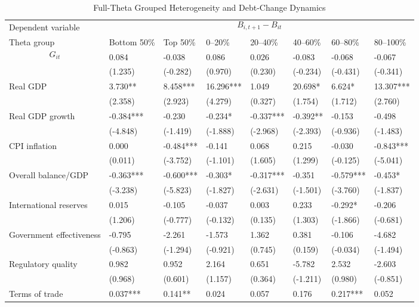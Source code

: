 \begin{table}[H]\centering
\begin{threeparttable}
\caption{Full-Theta Grouped Heterogeneity and Debt-Change Dynamics}
\label{tab:theta_group_heterogeneity_debt}
\scriptsize
\begin{tabularx}{\textwidth}{lYYYYYYY}
\toprule
Dependent variable &  \\
\cmidrule(lr){2-8}
Theta group & Bottom 50\% & Top 50\% & 0--20\% & 20--40\% & 40--60\% & 60--80\% & 80--100\% \\
\midrule
$$G_{it}$$ & 0.084 & -0.038 & 0.086 & 0.026 & -0.083 & -0.068 & -0.067 \\
  & (1.235) & (-0.282) & (0.970) & (0.230) & (-0.234) & (-0.431) & (-0.341) \\
Real GDP & 3.730** & 8.458*** & 16.296*** & 1.049 & 20.698* & 6.624* & 13.307*** \\
  & (2.358) & (2.923) & (4.279) & (0.327) & (1.754) & (1.712) & (2.760) \\
Real GDP growth & -0.384*** & -0.230 & -0.234* & -0.337*** & -0.392** & -0.153 & -0.498 \\
  & (-4.848) & (-1.419) & (-1.888) & (-2.968) & (-2.393) & (-0.936) & (-1.483) \\
CPI inflation & 0.000 & -0.484*** & -0.141 & 0.068 & 0.215 & -0.030 & -0.843*** \\
  & (0.011) & (-3.752) & (-1.101) & (1.605) & (1.299) & (-0.125) & (-5.041) \\
Overall balance/GDP & -0.363*** & -0.600*** & -0.303* & -0.317*** & -0.351 & -0.579*** & -0.453* \\
  & (-3.238) & (-5.823) & (-1.827) & (-2.631) & (-1.501) & (-3.760) & (-1.837) \\
International reserves & 0.015 & -0.105 & -0.037 & 0.003 & 0.233 & -0.292* & -0.206 \\
  & (1.206) & (-0.777) & (-0.132) & (0.135) & (1.303) & (-1.866) & (-0.681) \\
Government effectiveness & -0.795 & -2.261 & -1.573 & 1.362 & 0.381 & -0.106 & -4.682 \\
  & (-0.863) & (-1.294) & (-0.921) & (0.745) & (0.159) & (-0.034) & (-1.494) \\
Regulatory quality & 0.982 & 0.952 & 2.164 & 0.651 & -5.782 & 2.532 & -2.603 \\
  & (0.968) & (0.601) & (1.157) & (0.364) & (-1.211) & (0.980) & (-0.851) \\
Terms of trade & 0.037*** & 0.141** & 0.024 & 0.057 & 0.176 & 0.217*** & 0.052 \\

\end{tabularx}
\end{threeparttable}
\end{table}
